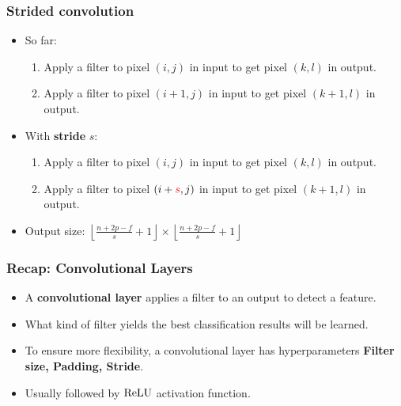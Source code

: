 \documentclass[10pt,hyperref={pdfpagelabels=false}]{beamer}
\begin{document}
\begin{frame}
    \frametitle{Strided convolution}
    \begin{itemize}
        \item So far:
        \begin{enumerate}
            \item Apply a filter to pixel $(i,j)$ in input to get pixel $(k,l)$ in output.
            \item Apply a filter to pixel $(i+1,j)$ in input to get pixel $(k+1,l)$ in output.
        \end{enumerate}
        \item With {\bf stride} $s$:
        \begin{enumerate}
            \item Apply a filter to pixel $(i,j)$ in input to get pixel $(k,l)$ in output.
            \item Apply a filter to pixel $(i+{\color{red}s},j)$ in input to get pixel $(k+1,l)$ in output.
        \end{enumerate}
        \item Output size: $\left\lfloor\frac{n+2p-f}{s}+1\right\rfloor\times \left\lfloor\frac{n+2p-f}{s}+1\right\rfloor$
    \end{itemize}
\end{frame}
\begin{frame}
    \frametitle{Recap: Convolutional Layers}
    \begin{itemize}
        \item A {\bf convolutional layer} applies a filter to an output to detect a feature.
        \item What kind of filter yields the best classification results will be learned.
        \item To ensure more flexibility, a convolutional layer has hyperparameters {\bf Filter size, Padding, Stride}.
        \item Usually followed by $\operatorname{ReLU}$ activation function.
    \end{itemize}
\end{frame}
\end{document}
